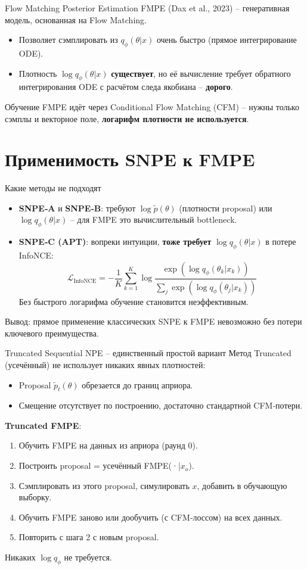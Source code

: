 \documentclass[10pt,aspectratio=169]{beamer}
\begin{document}
\begin{frame}{Flow Matching Posterior Estimation}
FMPE (Dax et al., 2023) – генеративная модель, основанная на Flow Matching.
\begin{itemize}
    \item Позволяет сэмплировать из $q_\phi(\theta|x)$ очень быстро (прямое интегрирование ODE).
    \item Плотность $\log q_\phi(\theta|x)$ \textbf{существует}, но её вычисление требует обратного интегрирования ODE с расчётом следа якобиана – \textbf{дорого}.
\end{itemize}
\pause
Обучение FMPE идёт через Conditional Flow Matching (CFM) – нужны только сэмплы и векторное поле, \textbf{логарифм плотности не используется}.
\end{frame}

\section{Применимость SNPE к FMPE}

\begin{frame}{Какие методы не подходят}
\begin{itemize}
    \item \textbf{SNPE‑A} и \textbf{SNPE‑B}: требуют $\log \tilde{p}(\theta)$ (плотности proposal) или $\log q_\phi(\theta|x)$ – для FMPE это вычислительный bottleneck.
    \item \textbf{SNPE‑C (APT)}: вопреки интуиции, \textbf{тоже требует} $\log q_\phi(\theta|x)$ в потере InfoNCE:
    \[
    \mathcal{L}_{\text{InfoNCE}} = -\frac{1}{K}\sum_{k=1}^K \log \frac{\exp(\log q_\phi(\theta_k|x_k))}{\sum_j \exp(\log q_\phi(\theta_j|x_k))}
    \]
    Без быстрого логарифма обучение становится неэффективным.
\end{itemize}
\pause
Вывод: прямое применение классических SNPE к FMPE невозможно без потери ключевого преимущества.
\end{frame}

\begin{frame}{Truncated Sequential NPE – единственный простой вариант}
Метод Truncated (усечённый) не использует никаких явных плотностей:
\begin{itemize}
    \item Proposal $\tilde{p}_t(\theta)$ обрезается до границ априора.
    \item Смещение отсутствует по построению, достаточно стандартной CFM‑потери.
\end{itemize}
\pause
\textbf{Truncated FMPE}:
\begin{enumerate}
    \item Обучить FMPE на данных из априора (раунд 0).
    \item Построить proposal = усечённый FMPE(·|$x_o$).
    \item Сэмплировать из этого proposal, симулировать $x$, добавить в обучающую выборку.
    \item Обучить FMPE заново или дообучить (с CFM‑лоссом) на всех данных.
    \item Повторить с шага 2 с новым proposal.
\end{enumerate}
Никаких $\log q_\phi$ не требуется.
\end{frame}
\end{document}
